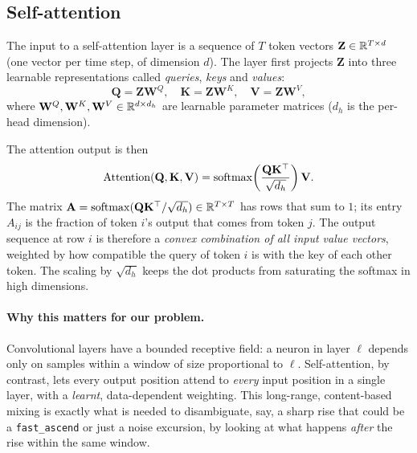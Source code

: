 \subsection{Self-attention}
\label{sec:selfattn-theory}

The input to a self-attention layer is a sequence of $T$ token vectors
$\mathbf{Z} \in \mathbb{R}^{T \times d}$ (one vector per time step, of dimension
$d$). The layer first projects $\mathbf{Z}$ into three learnable
representations called \emph{queries}, \emph{keys} and \emph{values}:
\begin{equation}
    \mathbf{Q} = \mathbf{Z} \mathbf{W}^Q,
    \quad
    \mathbf{K} = \mathbf{Z} \mathbf{W}^K,
    \quad
    \mathbf{V} = \mathbf{Z} \mathbf{W}^V,
    \label{eq:qkv}
\end{equation}
where $\mathbf{W}^Q, \mathbf{W}^K, \mathbf{W}^V \in \mathbb{R}^{d \times d_h}$
are learnable parameter matrices ($d_h$ is the per-head dimension).

The attention output is then
\begin{equation}
    \operatorname{Attention}(\mathbf{Q}, \mathbf{K}, \mathbf{V})
    = \operatorname{softmax}\!\left( \frac{\mathbf{Q} \mathbf{K}^\top}{\sqrt{d_h}} \right) \mathbf{V}.
    \label{eq:attention}
\end{equation}
The matrix $\mathbf{A} = \operatorname{softmax}(\mathbf{Q} \mathbf{K}^\top / \sqrt{d_h})
\in \mathbb{R}^{T \times T}$ has rows that sum to $1$; its entry $A_{ij}$ is
the fraction of token $i$'s output that comes from token $j$. The
output sequence at row $i$ is therefore a \emph{convex combination of
all input value vectors}, weighted by how compatible the query of token
$i$ is with the key of each other token. The scaling by $\sqrt{d_h}$
keeps the dot products from saturating the softmax in high dimensions.

\paragraph{Why this matters for our problem.}
Convolutional layers have a bounded receptive field: a neuron in layer
$\ell$ depends only on samples within a window of size proportional to
$\ell$. Self-attention, by contrast, lets every output position attend
to \emph{every} input position in a single layer, with a
\emph{learnt}, data-dependent weighting. This long-range, content-based
mixing is exactly what is needed to disambiguate, say, a sharp rise
that could be a \texttt{fast\_ascend} or just a noise excursion, by
looking at what happens \emph{after} the rise within the same window.

